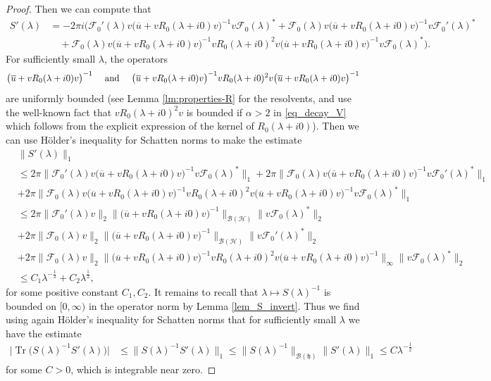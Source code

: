 \documentclass{article}
\def\B{\mathscr B}
\def\F{\mathscr F}
\def\H{\mathcal H}
\def\HS{\mathfrak h}
\def\Tr{\mathop{\mathrm{Tr}}\nolimits}
\begin{document}
\begin{proof}
Then we can compute that 
\begin{align*}
 S'(\lambda) 
&= -2\pi i \Big(\F_0'(\lambda)v \big(\overline{u} +v R_0(\lambda+i0)v\big)^{-1}v \F_0(\lambda)^* +\F_0(\lambda)v \big(\overline{u} +v R_0(\lambda+i0)v\big)^{-1}v \F_0'(\lambda)^* \\
&\quad +\F_0(\lambda)v \big(\overline{u} +v R_0(\lambda+i0)v\big)^{-1}v R_0(\lambda+i0)^2 
v \big(\overline{u} +v R_0(\lambda+i0)v\big)^{-1}v \F_0(\lambda)^* \Big).
\end{align*}
For sufficiently small $\lambda$, the operators 
$$
\big(\overline{u} +v R_0(\lambda+i0)v\big)^{-1} \quad \hbox{ and } \quad
\big(\overline{u} +v R_0(\lambda+i0)v\big)^{-1}v R_0(\lambda+i0)^2 v
\big(\overline{u} +v R_0(\lambda+i0)v\big)^{-1}
$$ 
are uniformly bounded (see Lemma \ref{lm:properties-R} for the resolvents, and use the well-known fact that $vR_0(\lambda+i0)^2v$ is bounded if $\alpha>2$ in \eqref{eq_decay_V} which follows from the explicit expression of the kernel of $R_0(\lambda+i0)$). Then we can use H\"{o}lder's inequality for Schatten norms to make the estimate 
\begin{align*}
&\big\|S'(\lambda)\big\|_1  \\
& \leq 2\pi \big\|\F_0'(\lambda)v \big(\overline{u} +v R_0(\lambda+i0)v\big)^{-1}v \F_0(\lambda)^* \big\|_1 + 2\pi \big\|\F_0(\lambda)v \big(\overline{u} +v R_0(\lambda+i0)v\big)^{-1}v \F_0'(\lambda)^* \big\|_1 \\
&+2\pi \big\|\F_0(\lambda)v\big(\overline{u} +v R_0(\lambda+i0)v\big)^{-1}v R_0(\lambda+i0)^2 v\big(\overline{u} +v R_0(\lambda+i0)v\big)^{-1}v \F_0(\lambda)^* \big\|_1 \\
&\leq 2\pi \|\F_0'(\lambda)v\|_2 \big\|\big(\overline{u} +v R_0(\lambda+i0)v\big)^{-1}\big\|_{\B(\H)} \|v \F_0(\lambda)^*\|_2 \\
& +2\pi  \|\F_0(\lambda)v\|_2  \big\|\big(\overline{u} +v R_0(\lambda+i0)v\big)^{-1}\big\|_{\B(\H)} \|v \F_0'(\lambda)^* \|_2\\
&+2\pi \big\|\F_0(\lambda)v\|_2  \big\|\big(\overline{u} +v R_0(\lambda+i0)v\big)^{-1}v R_0(\lambda+i0)^2 v\big(\overline{u} +v R_0(\lambda+i0)v\big)^{-1}\big\|_\infty \|v \F_0(\lambda)^* \|_2 \\
&\leq C_1 \lambda^{-\frac12}+C_2 \lambda^{\frac12},
\end{align*}
for some positive constant $C_1,C_2$. It remains to recall that $\lambda\mapsto S(\lambda)^{-1}$ is bounded on $[0,\infty)$ in the operator norm by Lemma \ref{lem_S_invert}. Thus we find using again H\"{o}lder's inequality for Schatten norms that for sufficiently small $\lambda$ we have the estimate 
\begin{align*}
\big|\Tr\big(S(\lambda)^{-1}S'(\lambda)\big)\big| &\leq \|S(\lambda)^{-1}S'(\lambda)\|_1 \leq \|S(\lambda)^{-1}\|_{\B(\HS)} \|S'(\lambda)\|_1 \leq C \lambda^{-\frac12}
\end{align*}
for some $C>0$, which is integrable near zero.


\end{proof}
\end{document}

